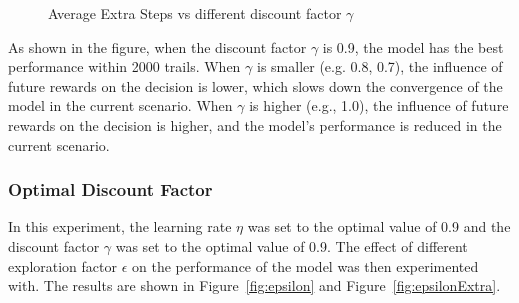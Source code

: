 \documentclass[conference]{IEEEtran}
\begin{document}
\begin{figure}[!ht]
    \centering
    \caption{Average Extra Steps vs different discount factor \({\gamma}\)}\label{fig:gammaExtra}
\end{figure}

As shown in the figure, when the discount factor \({\gamma}\) is 0.9, the model has the best performance within 2000 trails. When \({\gamma}\) is smaller (e.g. 0.8, 0.7), the influence of future rewards on the decision is lower, which slows down the convergence of the model in the current scenario. When \({\gamma}\) is higher (e.g., 1.0), the influence of future rewards on the decision is higher, and the model's performance is reduced in the current scenario.

\subsubsection{Optimal Discount Factor}

In this experiment, the learning rate \({\eta}\) was set to the optimal value of 0.9 and the discount factor \({\gamma}\)  was set to the optimal value of 0.9. The effect of different exploration factor \({\epsilon}\) on the performance of the model was then experimented with. The results are shown in Figure~\ref{fig:epsilon} and Figure~\ref{fig:epsilonExtra}.
\end{document}
